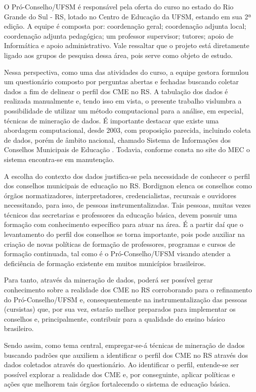 \documentclass[tg]{mdtufsm}
\begin{document}
O Pró-Conselho/UFSM é responsável pela oferta do curso no estado do Rio Grande do Sul - RS, lotado no Centro de Educação da UFSM, estando em sua 2ª edição. A equipe é composta por: coordenação geral; coordenação adjunta local; coordenação adjunta pedagógica; um professor supervisor; tutores; apoio de Informática e apoio administrativo. Vale ressaltar que o projeto está diretamente ligado aos grupos de pesquisa dessa área, pois serve como objeto de estudo. 

Nessa perspectiva, como uma das atividades do curso, a equipe gestora formulou um questionário composto por perguntas abertas e fechadas buscando coletar dados a fim de delinear o perfil dos CME no RS. A tabulação dos dados é realizada manualmente e, tendo isso em vista, o presente trabalho vislumbra a possibilidade de utilizar um método computacional para a análise, em especial, técnicas de mineração de dados. É importante destacar que existe uma abordagem computacional, desde 2003, com proposição parecida, incluindo coleta de dados, porém de âmbito nacional, chamado Sistema de Informações dos Conselhos Municipais de Educação \cite{sicme-site}. Todavia, conforme consta no site do MEC \citeyearpar{mec-site} o sistema encontra-se em manutenção. 

A escolha do contexto dos dados justifica-se pela necessidade de conhecer o perfil dos conselhos municipais de educação no RS. Bordignon \citeyearpar{bordignon2009} elenca os conselhos como órgãos normatizadores, interpretadores, credencialistas, recursais e ouvidores necessitando, para isso, de pessoas instrumentalizadas. Tais pessoas, muitas vezes técnicos das secretarias e professores da educação básica, devem possuir uma formação com conhecimento específico para atuar na área. É a partir daí que o levantamento do perfil dos conselhos se torna importante, pois pode auxiliar na criação de novas políticas de formação de professores, programas e cursos de formação continuada, tal como é o Pró-Conselho/UFSM visando atender a deficiência de formação existente em muitos municípios brasileiros.  

Para tanto, através da mineração de dados, poderá ser possível gerar conhecimento sobre a realidade dos CME no RS corroborando para o refinamento do Pró-Conselho/UFSM e, consequentemente na instrumentalização das pessoas (cursistas) que, por sua vez, estarão melhor preparados para implementar os conselhos e, principalmente, contribuir para a qualidade do ensino básico brasileiro.

Sendo assim, como tema central, empregar-se-á técnicas de mineração de dados buscando padrões que auxiliem a identificar o perfil dos CME no RS através dos dados coletados através do questionário. Ao identificar o perfil, entende-se ser possível explorar a realidade dos CME e, por conseguinte, aplicar políticas e ações que melhorem tais órgãos fortalecendo o sistema de educação básica.
\end{document}
